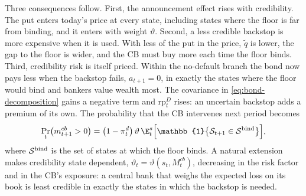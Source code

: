 \begin{yaddblock}
Three consequences follow. First, the announcement effect rises with credibility.
The put enters today's price at every state, including states where the floor is far
from binding, and it enters with weight $\vartheta$. Second, a less credible
backstop is more expensive when it is used. With less of the put in the price,
$\tilde q$ is lower, the gap to the floor is wider, and the CB must buy more each
time the floor binds. Third, credibility risk is itself priced. Within the
no-default branch the bond now pays less when the backstop fails, $a_{t+1}=0$, in
exactly the states where the floor would bind and bankers value wealth most. The
covariance in \eqref{eq:bond-decomposition} gains a negative term and
$\mathrm{rp}^{D}_t$ rises: an uncertain backstop adds a premium of its own. The
probability that the CB intervenes next period becomes
\begin{equation}
\Pr_t\bigl(m^{cb}_{t+1}>0\bigr)
=\bigl(1-\pi^{d}_t\bigr)\,\vartheta\,
\E^{s}_t\Bigl[\mathbb{1}\bigl\{\mathcal{S}_{t+1}\in\mathcal{S}^{\rm bind}\bigr\}\Bigr],
\label{eq:prob-intervention-uncertain}
\end{equation}
where $\mathcal{S}^{\rm bind}$ is the set of states at which the floor binds.
A natural extension makes credibility state dependent, $\vartheta_t=\vartheta(s_t,M^{cb}_t)$,
decreasing in the risk factor and in the CB's exposure: a central bank that weighs
the expected loss on its book is least credible in exactly the states in which the
backstop is needed.
\end{yaddblock}
